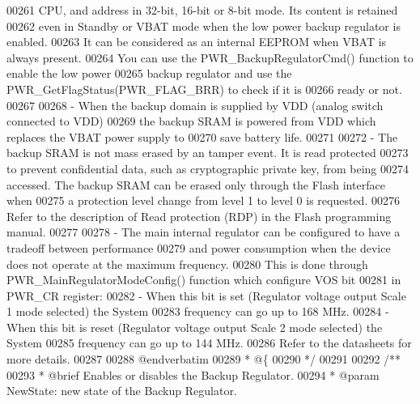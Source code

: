 \begin{DoxyCode}
00261 \textcolor{comment}{   CPU, and address in 32-bit, 16-bit or 8-bit mode. Its content is retained }
00262 \textcolor{comment}{   even in Standby or VBAT mode when the low power backup regulator is enabled. }
00263 \textcolor{comment}{   It can be considered as an internal EEPROM when VBAT is always present.}
00264 \textcolor{comment}{   You can use the PWR\_BackupRegulatorCmd() function to enable the low power}
00265 \textcolor{comment}{   backup regulator and use the PWR\_GetFlagStatus(PWR\_FLAG\_BRR) to check if it is}
00266 \textcolor{comment}{   ready or not. }
00267 \textcolor{comment}{}
00268 \textcolor{comment}{ - When the backup domain is supplied by VDD (analog switch connected to VDD) }
00269 \textcolor{comment}{   the backup SRAM is powered from VDD which replaces the VBAT power supply to }
00270 \textcolor{comment}{   save battery life.}
00271 \textcolor{comment}{}
00272 \textcolor{comment}{ - The backup SRAM is not mass erased by an tamper event. It is read protected }
00273 \textcolor{comment}{   to prevent confidential data, such as cryptographic private key, from being }
00274 \textcolor{comment}{   accessed. The backup SRAM can be erased only through the Flash interface when}
00275 \textcolor{comment}{   a protection level change from level 1 to level 0 is requested. }
00276 \textcolor{comment}{   Refer to the description of Read protection (RDP) in the Flash programming manual.}
00277 \textcolor{comment}{}
00278 \textcolor{comment}{ - The main internal regulator can be configured to have a tradeoff between performance}
00279 \textcolor{comment}{   and power consumption when the device does not operate at the maximum frequency. }
00280 \textcolor{comment}{   This is done through PWR\_MainRegulatorModeConfig() function which configure VOS bit}
00281 \textcolor{comment}{   in PWR\_CR register: }
00282 \textcolor{comment}{      - When this bit is set (Regulator voltage output Scale 1 mode selected) the System}
00283 \textcolor{comment}{        frequency can go up to 168 MHz. }
00284 \textcolor{comment}{      - When this bit is reset (Regulator voltage output Scale 2 mode selected) the System}
00285 \textcolor{comment}{        frequency can go up to 144 MHz. }
00286 \textcolor{comment}{   Refer to the datasheets for more details.}
00287 \textcolor{comment}{           }
00288 \textcolor{comment}{@endverbatim}
00289 \textcolor{comment}{  * @\{}
00290 \textcolor{comment}{  */}
00291 
00292 \textcolor{comment}{/**}
00293 \textcolor{comment}{  * @brief  Enables or disables the Backup Regulator.}
00294 \textcolor{comment}{  * @param  NewState: new state of the Backup Regulator.}

\end{DoxyCode}

